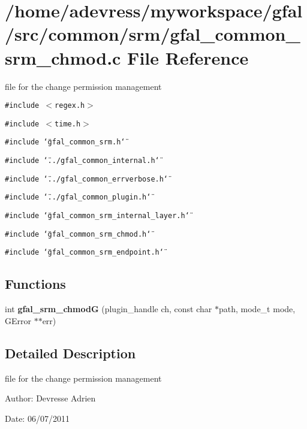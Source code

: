 \section{/home/adevress/myworkspace/gfal/src/common/srm/gfal\_\-common\_\-srm\_\-chmod.c File Reference}
\label{gfal__common__srm__chmod_8c}
file for the change permission management 

{\tt \#include $<$regex.h$>$}\par
{\tt \#include $<$time.h$>$}\par
{\tt \#include \char`\"{}gfal\_\-common\_\-srm.h\char`\"{}}\par
{\tt \#include \char`\"{}../gfal\_\-common\_\-internal.h\char`\"{}}\par
{\tt \#include \char`\"{}../gfal\_\-common\_\-errverbose.h\char`\"{}}\par
{\tt \#include \char`\"{}../gfal\_\-common\_\-plugin.h\char`\"{}}\par
{\tt \#include \char`\"{}gfal\_\-common\_\-srm\_\-internal\_\-layer.h\char`\"{}}\par
{\tt \#include \char`\"{}gfal\_\-common\_\-srm\_\-chmod.h\char`\"{}}\par
{\tt \#include \char`\"{}gfal\_\-common\_\-srm\_\-endpoint.h\char`\"{}}\par
\subsection*{Functions}
\begin{CompactItemize}
\item 
int \textbf{gfal\_\-srm\_\-chmod\-G} (plugin\_\-handle ch, const char $\ast$path, mode\_\-t mode, GError $\ast$$\ast$err)\label{gfal__common__srm__chmod_8c_ea54f75762a4ed09a0e57461ffa6fdd5}

\end{CompactItemize}


\subsection{Detailed Description}
file for the change permission management 

\begin{Desc}
\item[Author:]Devresse Adrien \end{Desc}
\begin{Desc}
\item[Date:]06/07/2011 \end{Desc}
